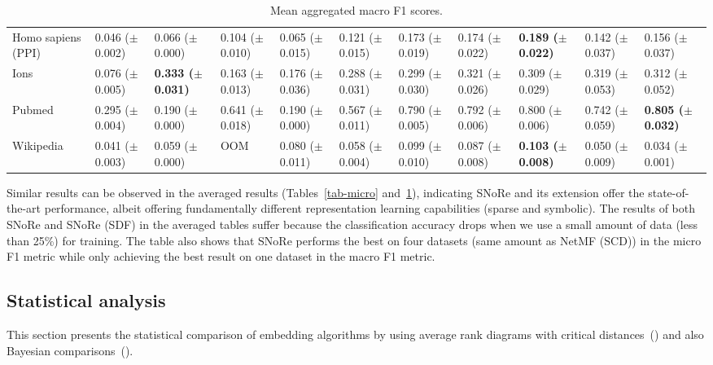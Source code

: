 \documentclass[twoside,11pt]{article}
\begin{document}
\begin{table}[htb!]
{\begin{tabular}{lllllllllll}
Homo sapiens (PPI) &  0.046 ($\pm$0.002) &    0.066 ($\pm$0.000) &   0.104 ($\pm$0.010) &  0.065 ($\pm$0.015) &  0.121 ($\pm$0.015) &  0.173 ($\pm$0.019) &  0.174 ($\pm$0.022) &\bfseries  0.189 ($\pm$0.022) &  0.142 ($\pm$0.037) &  0.156 ($\pm$ 0.037)\\
Ions               &  0.076 ($\pm$0.005) &\bfseries  0.333 ($\pm$0.031) &  0.163 ($\pm$0.013) &  0.176 ($\pm$0.036) &  0.288 ($\pm$0.031) &   0.299 ($\pm$0.030) &   0.321 ($\pm$ 0.026) &  0.309 ($\pm$0.029) &  0.319 ($\pm$0.053) &  0.312 ($\pm$ 0.052)\\
Pubmed             &  0.295 ($\pm$0.004) &     0.190 ($\pm$0.000) &  0.641 ($\pm$0.018) &     0.190 ($\pm$0.000) &  0.567 ($\pm$0.011) &   0.790 ($\pm$0.005) &  0.792 ($\pm$0.006) &    0.800 ($\pm$0.006) &  0.742 ($\pm$0.059) &\bfseries  0.805 ($\pm$ 0.032)\\
Wikipedia          &  0.041 ($\pm$0.003) &    0.059 ($\pm$0.000) &              OOM &   0.080 ($\pm$0.011) &  0.058 ($\pm$0.004) &   0.099 ($\pm$0.010) &  0.087 ($\pm$0.008) &\bfseries  0.103 ($\pm$0.008) &   0.050 ($\pm$0.009) &  0.034 ($\pm$ 0.001)\\
\bottomrule
\end{tabular}
} 	\caption{Mean aggregated macro F1 scores.}
	\label{tab-macro}
\end{table}

Similar results can be observed in the averaged results (Tables~\ref{tab-micro} and~\ref{tab-macro}), indicating SNoRe and its extension offer the state-of-the-art performance, albeit offering fundamentally different representation learning capabilities (sparse and symbolic). The results of both SNoRe and SNoRe (SDF) in the averaged tables suffer because the classification accuracy drops when we use a small amount of data (less than 25\%) for training. The table also shows that SNoRe performs the best on four datasets (same amount as NetMF (SCD)) in the micro F1 metric while only achieving the best result on one dataset in the macro F1 metric.

\subsection{Statistical analysis}
\label{sec:statistical}
This section presents the statistical comparison of embedding algorithms by using average rank diagrams with critical distances~(\cite{demsar2006statistical}) and also Bayesian comparisons~(\cite{benavoli2017bayes}).
\end{document}
